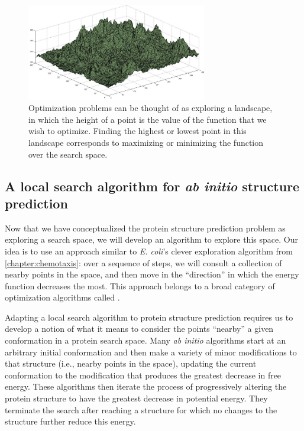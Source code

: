 \begin{figure}[h]
	\centering
	\mySfFamily
	\includegraphics[width = 0.7\textwidth]{../images/energy_landscape.png}
	\caption{Optimization problems can be thought of as exploring a landscape, in which the height of a point is the value of the function that we wish to optimize. Finding the highest or lowest point in this landscape corresponds to maximizing or minimizing the function over the search space.}
	\label{fig:energy_landscape}
\end{figure}

\FloatBarrier
{}
\subsection{A local search algorithm for \textit{ab initio} structure prediction}

Now that we have conceptualized the protein structure prediction problem as exploring a search space, we will develop an algorithm to explore this space. Our idea is to use an approach similar to \textit{E. coli}'s clever exploration algorithm from \autoref{chapter:chemotaxis}: over a sequence of steps, we will consult a collection of nearby points in the space, and then move in the ``direction'' in which the energy function decreases the most. This approach belongs to a broad category of optimization algorithms called .

Adapting a local search algorithm to protein structure prediction requires us to develop a notion of what it means to consider the points ``nearby'' a given conformation in a protein search space. Many \textit{ab initio} algorithms start at an arbitrary initial conformation and then make a variety of minor modifications to that structure (i.e., nearby points in the space), updating the current conformation to the modification that produces the greatest decrease in free energy. These algorithms then iterate the process of progressively altering the protein structure to have the greatest decrease in potential energy. They terminate the search after reaching a structure for which no changes to the structure further reduce this energy.

